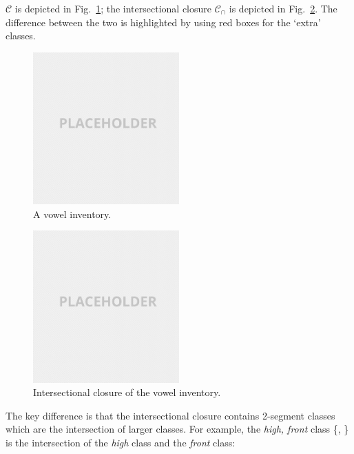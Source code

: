 \documentclass[11pt, oneside]{article}   	%
\begin{document}
\vspace{\baselineskip} \noindent $\mathcal C$ is depicted in Fig.~\ref{fig:vowel_inventory}; the intersectional closure $\mathcal C_\cap$ is depicted in Fig.~\ref{fig:vowel_inventory_closure}. The difference between the two is highlighted by using red boxes for the `extra' classes.

\begin{figure}[h]
  \centering
  \includegraphics[width=0.5\textwidth]{placeholder.png}
  \caption{A vowel inventory.}
  \label{fig:vowel_inventory}
\end{figure}

\begin{figure}[h]
  \centering
  \includegraphics[width=0.5\textwidth]{placeholder.png}
  \caption{Intersectional closure of the vowel inventory.}
  \label{fig:vowel_inventory_closure}
\end{figure}

The key difference is that the intersectional closure contains 2-segment classes which are the intersection of larger classes. For example, the \textit{high, front} class \{, \} is the intersection of the \textit{high} class and the \textit{front} class:
\end{document}
